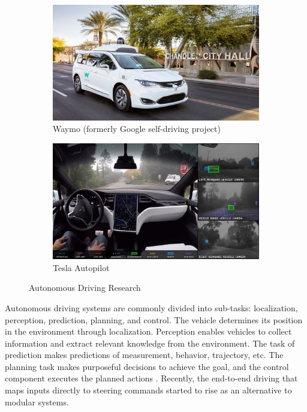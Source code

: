 \begin{figure}[H]
\centering
\begin{subfigure}[b]{0.485\textwidth}
    \centering
    \includegraphics[width=\textwidth]{figures/chapter_intro/waymo.jpg}
    \caption{Waymo (formerly Google self-driving project)}
    \label{fig:waymo}
\end{subfigure}
\hfill
\begin{subfigure}[b]{0.485\textwidth}
    \centering
    \includegraphics[width=\textwidth]{figures/chapter_intro/tesla_autopilot.jpg}
    \caption{Tesla Autopilot}
    \label{fig:tesla}
\end{subfigure}
\hfill
\caption{Autonomous Driving Research}
\label{fig.autonomous}
\end{figure}

Autonomous driving systems are commonly divided into sub-tasks: localization, perception, prediction, planning, and control. The vehicle determines its position in the environment through localization. Perception enables vehicles to collect information and extract relevant knowledge from the environment. The task of prediction makes predictions of measurement, behavior, trajectory, etc. The planning task makes purposeful decisions to achieve the goal, and the control component executes the planned actions \citep{pendleton2017perception}. Recently, the end-to-end driving that maps inputs directly to steering commands started to rise as an alternative to modular systems.

